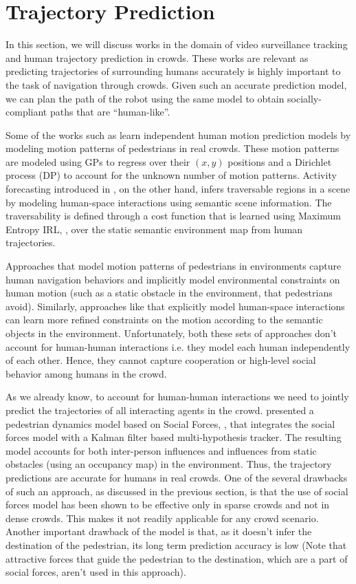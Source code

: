 \section{Trajectory Prediction}
\label{sec:survey-traj-pred-2}

In this section, we will discuss works in the domain of video surveillance tracking and human trajectory prediction in crowds. These works are relevant as predicting trajectories of surrounding humans accurately is highly important to the task of navigation through crowds. Given such an accurate prediction model, we can plan the path of the robot using the same model to obtain socially-compliant paths that are ``human-like''. 

Some of the works such as \cite{joseph2011bayesian} learn independent human motion prediction models by modeling motion patterns of pedestrians in real crowds. These motion patterns are modeled using GPs to regress over their $(x,y)$ positions and a Dirichlet process (DP) to account for the unknown number of motion patterns. Activity forecasting introduced in \cite{kitani2012activity}, on the other hand, infers traversable regions in a scene by modeling human-space interactions using semantic scene information. The traversability is defined through a cost function that is learned using Maximum Entropy IRL, \cite{Ziebart2008MaximumEI}, over the static semantic environment map from human trajectories.

Approaches that model motion patterns of pedestrians in environments capture human navigation behaviors and implicitly model environmental constraints on human motion (such as a static obstacle in the environment, that pedestrians avoid). Similarly, approaches like \cite{kitani2012activity} that explicitly model human-space interactions can learn more refined constraints on the motion according to the semantic objects in the environment. Unfortunately, both these sets of approaches don't account for human-human interactions i.e. they model each human independently of each other. Hence, they cannot capture cooperation or high-level social behavior among humans in the crowd.

As we already know, to account for human-human interactions we need to jointly predict the trajectories of all interacting agents in the crowd. \cite{luber2010people} presented a pedestrian dynamics model based on Social Forces, \cite{helbing95}, that integrates the social forces model with a Kalman filter based multi-hypothesis tracker. The resulting model accounts for both inter-person influences and influences from static obstacles (using an occupancy map) in the environment. Thus, the trajectory predictions are accurate for humans in real crowds. One of the several drawbacks of such an approach, as discussed in the previous section, is that the use of social forces model has been shown to be effective only in sparse crowds and not in dense crowds. This makes it not readily applicable for any crowd scenario. Another important drawback of the model is that, as it doesn't infer the destination of the pedestrian, its long term prediction accuracy is low (Note that attractive forces that guide the pedestrian to the destination, which are a part of social forces, aren't used in this approach).

